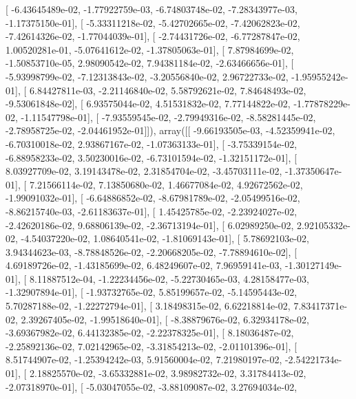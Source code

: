 \documentclass{article}
\begin{document}
       [ -6.43645489e-02,  -1.77922759e-03,  -6.74803748e-02,
         -7.28343977e-03,  -1.17375150e-01],
       [ -5.33311218e-02,  -5.42702665e-02,  -7.42062823e-02,
         -7.42614326e-02,  -1.77044039e-01],
       [ -2.74431726e-02,  -6.77287847e-02,   1.00520281e-01,
         -5.07641612e-02,  -1.37805063e-01],
       [  7.87984699e-02,  -1.50853710e-05,   2.98090542e-02,
          7.94381184e-02,  -2.63466656e-01],
       [ -5.93998799e-02,  -7.12313843e-02,  -3.20556840e-02,
          2.96722733e-02,  -1.95955242e-01],
       [  6.84427811e-03,  -2.21146840e-02,   5.58792621e-02,
          7.84648493e-02,  -9.53061848e-02],
       [  6.93575044e-02,   4.51531832e-02,   7.77144822e-02,
         -1.77878229e-02,  -1.11547798e-01],
       [ -7.93559545e-02,  -2.79949316e-02,  -8.58281445e-02,
         -2.78958725e-02,  -2.04461952e-01]]), array([[ -9.66193505e-03,  -4.52359941e-02,  -6.70310018e-02,
          2.93867167e-02,  -1.07363133e-01],
       [ -3.75339154e-02,  -6.88958233e-02,   3.50230016e-02,
         -6.73101594e-02,  -1.32151172e-01],
       [  8.03927709e-02,   3.19143478e-02,   2.31854704e-02,
         -3.45703111e-02,  -1.37350647e-01],
       [  7.21566114e-02,   7.13850680e-02,   1.46677084e-02,
          4.92672562e-02,  -1.99091032e-01],
       [ -6.64886852e-02,  -8.67981789e-02,  -2.05499516e-02,
         -8.86215740e-03,  -2.61183637e-01],
       [  1.45425785e-02,  -2.23924027e-02,  -2.42620186e-02,
          9.68806139e-02,  -2.36713194e-01],
       [  6.02989250e-02,   2.92105332e-02,  -4.54037220e-02,
          1.08640541e-02,  -1.81069143e-01],
       [  5.78692103e-02,   3.94344623e-03,  -8.78848526e-02,
         -2.20668205e-02,  -7.78894610e-02],
       [  4.69189726e-02,  -1.43185699e-02,   6.48249607e-02,
          7.96959141e-03,  -1.30127149e-01],
       [  8.11887512e-04,  -1.22234456e-02,  -5.22730465e-03,
          4.28158477e-03,  -1.32907894e-01],
       [ -1.93732765e-02,   5.85199657e-02,  -5.14595443e-02,
          5.70287188e-02,  -1.22272794e-01],
       [  3.18498315e-02,   6.62218814e-02,   7.83417371e-02,
          2.39267405e-02,  -1.99518640e-01],
       [ -8.38879676e-02,   6.32934178e-02,  -3.69367982e-02,
          6.44132385e-02,  -2.22378325e-01],
       [  8.18036487e-02,  -2.25892136e-02,   7.02142965e-02,
         -3.31854213e-02,  -2.01101396e-01],
       [  8.51744907e-02,  -1.25394242e-03,   5.91560004e-02,
          7.21980197e-02,  -2.54221734e-01],
       [  2.18825570e-02,  -3.65332881e-02,   3.98982732e-02,
          3.31784413e-02,  -2.07318970e-01],
       [ -5.03047055e-02,  -3.88109087e-02,   3.27694034e-02,
\end{document}
